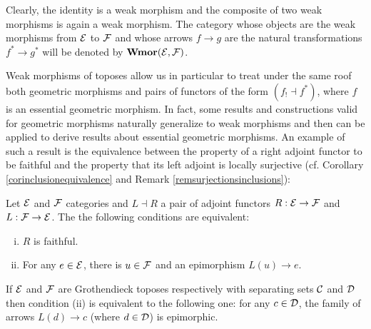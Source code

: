 \documentclass[a4paper,12pt]{article}
\begin{document}
Clearly, the identity is a weak morphism and the composite of two weak morphisms is again a weak morphism. The category whose objects are the weak morphisms from $\cal E$ to $\cal F$ and whose arrows $f\to g$ are the natural transformations $f^{\ast}\to g^{\ast}$ will be denoted by $\textup{\bf Wmor}({\cal E}, {\cal F})$.

Weak morphisms of toposes allow us in particular to treat under the same roof both geometric morphisms and pairs of functors of the form $(f_{!}\dashv f^{\ast})$, where $f$ is an essential geometric morphism. In fact, some results and constructions valid for geometric morphisms naturally generalize to weak morphisms and then can be applied to derive results about essential geometric morphisms. An example of such a result is the equivalence between the property of a right adjoint functor to be faithful and the property that its left adjoint is locally surjective (cf. Corollary \ref{corinclusionequivalence} and Remark \ref{remsurjectionsinclusions}):

\begin{proposition}\label{propadjproperty}
	Let $\cal E$ and $\cal F$ categories and $L\dashv R$ a pair of adjoint functors $R:{\cal E}\to {\cal F}$ and $L:{\cal F}\to {\cal E}$. The the following conditions are equivalent:
	\begin{enumerate}[(i)]
		\item $R$ is faithful.
		
		\item For any $e\in {\cal E}$, there is $u\in {\cal F}$ and an epimorphism $L(u)\to e$.
	\end{enumerate}
	
	If $\cal E$ and $\cal F$ are Grothendieck toposes respectively with separating sets $\cal C$ and $\cal D$ then condition (ii) is equivalent to the following one: for any $c\in {\cal D}$, the family of arrows $L(d)\to c$ (where $d\in {\cal D}$) is epimorphic.
\end{proposition}
\end{document}
